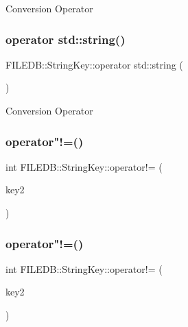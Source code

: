 Conversion Operator \mbox{\label{classFILEDB_1_1StringKey_a4ce28a2e70cc35cbf7dd8f7a9424fbb0}} 
\subsubsection{\texorpdfstring{operator std::string()}{operator std::string()}\hspace{0.1cm}{\footnotesize\ttfamily [2/2]}}
{\footnotesize\ttfamily F\+I\+L\+E\+D\+B\+::\+String\+Key\+::operator std\+::string (\begin{DoxyParamCaption}\item[{void}]{ }\end{DoxyParamCaption})}

Conversion Operator \mbox{\label{classFILEDB_1_1StringKey_ad7c210e36fa7438742afa4ed3c66a3df}} 
\subsubsection{\texorpdfstring{operator"!=()}{operator!=()}\hspace{0.1cm}{\footnotesize\ttfamily [1/2]}}
{\footnotesize\ttfamily int F\+I\+L\+E\+D\+B\+::\+String\+Key\+::operator!= (\begin{DoxyParamCaption}\item[{const \mbox{\hyperlink{classFILEDB_1_1StringKey}{String\+Key}} \&}]{key2 }\end{DoxyParamCaption})}

\mbox{\label{classFILEDB_1_1StringKey_ad7c210e36fa7438742afa4ed3c66a3df}} 
\subsubsection{\texorpdfstring{operator"!=()}{operator!=()}\hspace{0.1cm}{\footnotesize\ttfamily [2/2]}}
{\footnotesize\ttfamily int F\+I\+L\+E\+D\+B\+::\+String\+Key\+::operator!= (\begin{DoxyParamCaption}\item[{const \mbox{\hyperlink{classFILEDB_1_1StringKey}{String\+Key}} \&}]{key2 }\end{DoxyParamCaption})}

